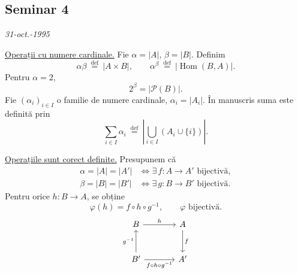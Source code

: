 
\subsection*{Seminar 4}
\begin{flushright}
\textit{31-oct.-1995 
}
\end{flushright}
\begingroup
\setlength{\abovedisplayskip}{5pt}
\setlength{\belowdisplayskip}{5pt}
\setlength{\abovedisplayshortskip}{3pt}
\setlength{\belowdisplayshortskip}{3pt}

\noindent\underline{Operații cu numere cardinale.}
Fie $\alpha=|A|$, $\beta=|B|$. Definim
\[
  \alpha\beta\ \overset{\mathrm{def}}{=}\ |A\times B|,
  \qquad
  \alpha^{\beta}\ \overset{\mathrm{def}}{=}\
     |\operatorname{Hom}(B,A)|.
\]
Pentru $\alpha=2$,
\[
  2^{\beta}=|\mathcal P(B)|.
\]
Fie $(\alpha_i)_{i\in I}$ o familie de numere cardinale,
$\alpha_i=|A_i|$. În manuscris suma este definită prin
\[
  \sum_{i\in I}\alpha_i\ \overset{\mathrm{def}}{=}\
  \left|\bigcup_{i\in I}(A_i\cup\{i\})\right|.
\]

\noindent\underline{Operațiile sunt corect definite.}
Presupunem că
\[
\begin{aligned}
 \alpha=|A|=|A'|&\iff\exists\,f:A\longrightarrow A'\text{ bijectivă},\\
 \beta=|B|=|B'|&\iff\exists\,g:B\longrightarrow B'\text{ bijectivă}.
\end{aligned}
\]
Pentru orice $h:B\longrightarrow A$, se obține
\[
  \varphi(h)=f\circ h\circ g^{-1},\qquad\varphi\text{ bijectivă}.
\]
\[
\begin{tikzcd}[column sep=large,row sep=large]
 B\arrow[r,"h"] & A\arrow[d,"f"]\\
 B'\arrow[u,"g^{-1}"]\arrow[r,"f\circ h\circ g^{-1}"'] & A'
\end{tikzcd}
\]

